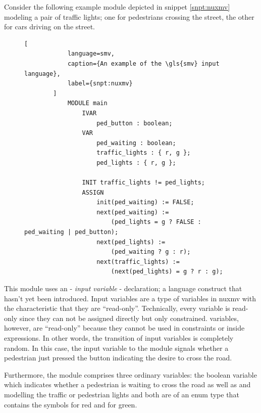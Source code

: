 \begin{example}
    Consider the following example module depicted in snippet \ref{snpt:nuxmv} modeling a pair of traffic lights; one for pedestrians crossing the street, the other for cars driving on the street.

    \begin{figure}
        \begin{lstlisting}[
            language=smv,
            caption={An example of the \gls{smv} input language},
            label={snpt:nuxmv}
        ]
            MODULE main
                IVAR
                    ped_button : boolean;
                VAR
                    ped_waiting : boolean;
                    traffic_lights : { r, g };
                    ped_lights : { r, g };

                INIT traffic_lights != ped_lights;
                ASSIGN
                    init(ped_waiting) := FALSE;
                    next(ped_waiting) :=
                        (ped_lights = g ? FALSE : ped_waiting | ped_button);
                    next(ped_lights) :=
                        (ped_waiting ? g : r);
                    next(traffic_lights) :=
                        (next(ped_lights) = g ? r : g);
        \end{lstlisting}
    \end{figure}

    This module uses an  - \textit{input variable} - declaration; a language construct that hasn't yet been introduced.
    Input variables are a type of variables in \gls{nuxmv} with the characteristic that they are \enquote{read-only}.
    Technically, every variable is read-only since they can not be assigned directly but only constrained.
     variables, however, are \enquote{read-only} because they cannot be used in  constraints or inside  expressions.
    In other words, the transition of input variables is completely random.
    In this case, the input variable to the module signals whether a pedestrian just pressed the button indicating the desire to cross the road.

    Furthermore, the module comprises three ordinary variables: the boolean variable  which indicates whether a pedestrian is waiting to cross the road as well as  and  modelling the traffic or pedestrian lights and both are of an enum type that contains the symbols  for red and  for green.


\end{example}
